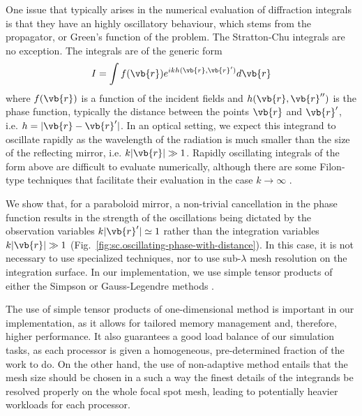 \documentclass[11pt,SymmetricalJury]{inrsthesis/inrsthesis}
\begin{document}
One issue that typically arises in the numerical evaluation of diffraction
integrals is that they have an highly oscillatory behaviour, which stems from
the propagator, or Green's function of the problem. The Stratton-Chu integrals
are no exception. The integrals are of the generic form
  \begin{equation}
    I = \int f(\vb{r})e^{ikh(\vb{r},\vb{r}')}d\vb{r}
  \end{equation}
where $f(\vb{r})$ is a function of the incident fields and $h(\vb{r},\vb{r}'')$
is the phase function, typically the distance between the points $\vb{r}$ and
$\vb{r}'$, i.e. $h=|\vb{r}-\vb{r}'|$. In an optical setting, we expect this
integrand to oscillate rapidly as the wavelength of the radiation is much
smaller than the size of the reflecting mirror, i.e. $k|\vb{r}|\gg1$. Rapidly
oscillating integrals of the form above are difficult to evaluate numerically,
although there are some Filon-type techniques that facilitate their evaluation
in the case $k\rightarrow\infty$ \cite{Iserles2004,Ganesh2007}.

We show that, for a paraboloid mirror, a non-trivial cancellation in the phase
function results in the strength of the oscillations being dictated by the
observation variables $k|\vb{r}'|\simeq1$ rather than the integration variables
$k|\vb{r}|\gg1$ (Fig.~\ref{fig:sc.oscillating-phase-with-distance}). In this
case, it is not necessary to use specialized techniques, nor to use
sub-$\lambda$ mesh resolution on the integration surface. In our implementation,
we use simple tensor products of either the Simpson or Gauss-Legendre methods
\cite[\S4.6]{Press1986}.

The use of simple tensor products of one-dimensional method is important in our
implementation, as it allows for tailored memory management and, therefore,
higher performance. It also guarantees a good load balance of our simulation
tasks, as each processor is given a homogeneous, pre-determined fraction of the
work to do. On the other hand, the use of non-adaptive method entails that the
mesh size should be chosen in a such a way the finest details of the integrands
be resolved properly on the whole focal spot mesh, leading to potentially
heavier workloads for each processor.
\end{document}
